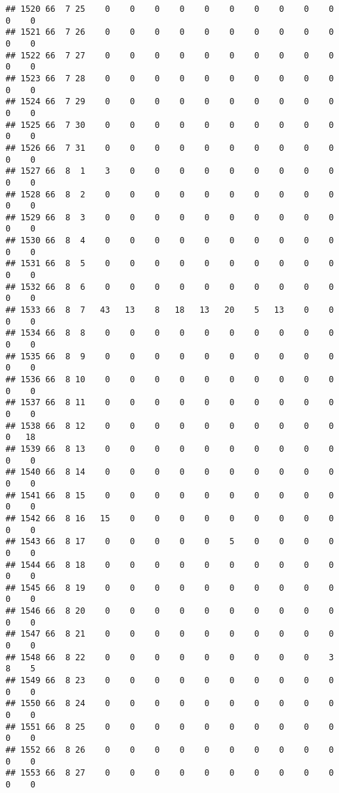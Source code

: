 \documentclass[]{article}
\begin{document}
\begin{verbatim}
## 1520 66  7 25    0    0    0    0    0    0    0    0    0    0    0    0
## 1521 66  7 26    0    0    0    0    0    0    0    0    0    0    0    0
## 1522 66  7 27    0    0    0    0    0    0    0    0    0    0    0    0
## 1523 66  7 28    0    0    0    0    0    0    0    0    0    0    0    0
## 1524 66  7 29    0    0    0    0    0    0    0    0    0    0    0    0
## 1525 66  7 30    0    0    0    0    0    0    0    0    0    0    0    0
## 1526 66  7 31    0    0    0    0    0    0    0    0    0    0    0    0
## 1527 66  8  1    3    0    0    0    0    0    0    0    0    0    0    0
## 1528 66  8  2    0    0    0    0    0    0    0    0    0    0    0    0
## 1529 66  8  3    0    0    0    0    0    0    0    0    0    0    0    0
## 1530 66  8  4    0    0    0    0    0    0    0    0    0    0    0    0
## 1531 66  8  5    0    0    0    0    0    0    0    0    0    0    0    0
## 1532 66  8  6    0    0    0    0    0    0    0    0    0    0    0    0
## 1533 66  8  7   43   13    8   18   13   20    5   13    0    0    0    0
## 1534 66  8  8    0    0    0    0    0    0    0    0    0    0    0    0
## 1535 66  8  9    0    0    0    0    0    0    0    0    0    0    0    0
## 1536 66  8 10    0    0    0    0    0    0    0    0    0    0    0    0
## 1537 66  8 11    0    0    0    0    0    0    0    0    0    0    0    0
## 1538 66  8 12    0    0    0    0    0    0    0    0    0    0    0   18
## 1539 66  8 13    0    0    0    0    0    0    0    0    0    0    0    0
## 1540 66  8 14    0    0    0    0    0    0    0    0    0    0    0    0
## 1541 66  8 15    0    0    0    0    0    0    0    0    0    0    0    0
## 1542 66  8 16   15    0    0    0    0    0    0    0    0    0    0    0
## 1543 66  8 17    0    0    0    0    0    5    0    0    0    0    0    0
## 1544 66  8 18    0    0    0    0    0    0    0    0    0    0    0    0
## 1545 66  8 19    0    0    0    0    0    0    0    0    0    0    0    0
## 1546 66  8 20    0    0    0    0    0    0    0    0    0    0    0    0
## 1547 66  8 21    0    0    0    0    0    0    0    0    0    0    0    0
## 1548 66  8 22    0    0    0    0    0    0    0    0    0    3    8    5
## 1549 66  8 23    0    0    0    0    0    0    0    0    0    0    0    0
## 1550 66  8 24    0    0    0    0    0    0    0    0    0    0    0    0
## 1551 66  8 25    0    0    0    0    0    0    0    0    0    0    0    0
## 1552 66  8 26    0    0    0    0    0    0    0    0    0    0    0    0
## 1553 66  8 27    0    0    0    0    0    0    0    0    0    0    0    0

\end{verbatim}
\end{document}
